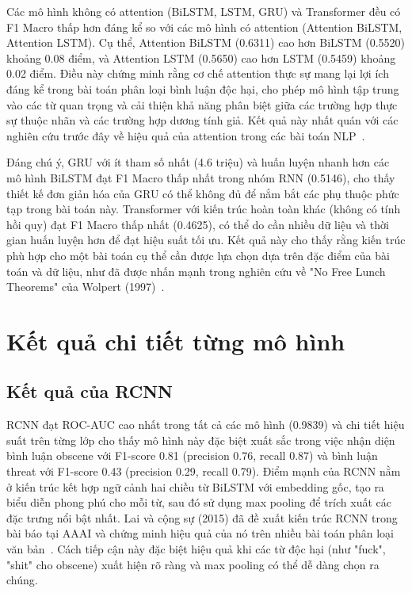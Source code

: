 \documentclass[../BTL.tex]{subfiles}
\begin{document}
Các mô hình không có attention (BiLSTM, LSTM, GRU) và Transformer đều có F1 Macro thấp hơn đáng kể so với các mô hình có attention (Attention BiLSTM, Attention LSTM). Cụ thể, Attention BiLSTM (0.6311) cao hơn BiLSTM (0.5520) khoảng 0.08 điểm, và Attention LSTM (0.5650) cao hơn LSTM (0.5459) khoảng 0.02 điểm. Điều này chứng minh rằng cơ chế attention thực sự mang lại lợi ích đáng kể trong bài toán phân loại bình luận độc hại, cho phép mô hình tập trung vào các từ quan trọng và cải thiện khả năng phân biệt giữa các trường hợp thực sự thuộc nhãn và các trường hợp dương tính giả. Kết quả này nhất quán với các nghiên cứu trước đây về hiệu quả của attention trong các bài toán NLP~\cite{bahdanau2014attention,yang2016hierarchical}.

Đáng chú ý, GRU với ít tham số nhất (4.6 triệu) và huấn luyện nhanh hơn các mô hình BiLSTM đạt F1 Macro thấp nhất trong nhóm RNN (0.5146), cho thấy thiết kế đơn giản hóa của GRU có thể không đủ để nắm bắt các phụ thuộc phức tạp trong bài toán này. Transformer với kiến trúc hoàn toàn khác (không có tính hồi quy) đạt F1 Macro thấp nhất (0.4625), có thể do cần nhiều dữ liệu và thời gian huấn luyện hơn để đạt hiệu suất tối ưu. Kết quả này cho thấy rằng kiến trúc phù hợp cho một bài toán cụ thể cần được lựa chọn dựa trên đặc điểm của bài toán và dữ liệu, như đã được nhấn mạnh trong nghiên cứu về "No Free Lunch Theorems" của Wolpert (1997)~\cite{wolpert1997no}.

\section{Kết quả chi tiết từng mô hình}

\subsection{Kết quả của RCNN}
RCNN đạt ROC-AUC cao nhất trong tất cả các mô hình (0.9839) và chi tiết hiệu suất trên từng lớp cho thấy mô hình này đặc biệt xuất sắc trong việc nhận diện bình luận obscene với F1-score 0.81 (precision 0.76, recall 0.87) và bình luận threat với F1-score 0.43 (precision 0.29, recall 0.79). Điểm mạnh của RCNN nằm ở kiến trúc kết hợp ngữ cảnh hai chiều từ BiLSTM với embedding gốc, tạo ra biểu diễn phong phú cho mỗi từ, sau đó sử dụng max pooling để trích xuất các đặc trưng nổi bật nhất. Lai và cộng sự (2015) đã đề xuất kiến trúc RCNN trong bài báo tại AAAI và chứng minh hiệu quả của nó trên nhiều bài toán phân loại văn bản~\cite{lai2015rcnn}. Cách tiếp cận này đặc biệt hiệu quả khi các từ độc hại (như "fuck", "shit" cho obscene) xuất hiện rõ ràng và max pooling có thể dễ dàng chọn ra chúng.
\end{document}
